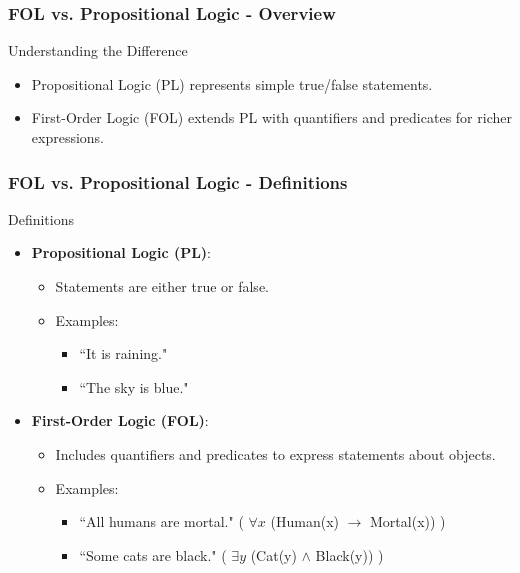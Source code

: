 \documentclass[aspectratio=169]{beamer}
\begin{document}
\begin{frame}[fragile]
  \frametitle{FOL vs. Propositional Logic - Overview}
  \begin{block}{Understanding the Difference}
    \begin{itemize}
      \item Propositional Logic (PL) represents simple true/false statements.
      \item First-Order Logic (FOL) extends PL with quantifiers and predicates for richer expressions.
    \end{itemize}
  \end{block}
\end{frame}

\begin{frame}[fragile]
  \frametitle{FOL vs. Propositional Logic - Definitions}
  \begin{block}{Definitions}
    \begin{itemize}
      \item \textbf{Propositional Logic (PL)}:
        \begin{itemize}
          \item Statements are either true or false.
          \item Examples: 
            \begin{itemize}
              \item ``It is raining."
              \item ``The sky is blue." 
            \end{itemize}
        \end{itemize}
      \item \textbf{First-Order Logic (FOL)}:
        \begin{itemize}
          \item Includes quantifiers and predicates to express statements about objects.
          \item Examples: 
            \begin{itemize}
              \item ``All humans are mortal." ( $\forall x$ (Human(x) $\rightarrow$ Mortal(x)) )
              \item ``Some cats are black." ( $\exists y$ (Cat(y) $\land$ Black(y)) )
            \end{itemize}
        \end{itemize}
    \end{itemize}
  \end{block}
\end{frame}
\end{document}
